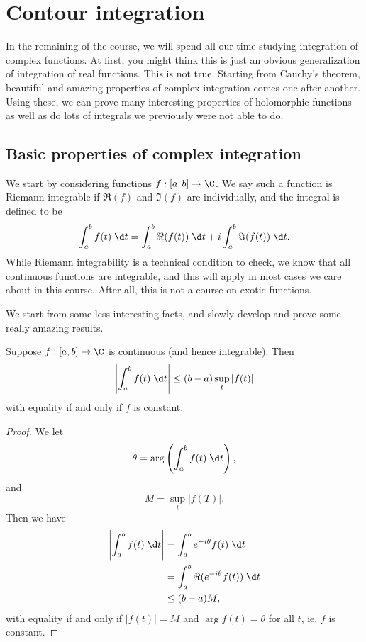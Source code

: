 \documentclass[a4paper]{article}
\begin{document}
\section{Contour integration}
In the remaining of the course, we will spend all our time studying integration of complex functions. At first, you might think this is just an obvious generalization of integration of real functions. This is not true. Starting from Cauchy's theorem, beautiful and amazing properties of complex integration comes one after another. Using these, we can prove many interesting properties of holomorphic functions as well as do lots of integrals we previously were not able to do.

\subsection{Basic properties of complex integration}
We start by considering functions $f: [a, b] \to \C$. We say such a function is Riemann integrable if $\Re(f)$ and $\Im (f)$ are individually, and the integral is defined to be
\[
  \int_a^b f(t) \;\d t = \int_a^b \Re(f(t))\;\d t + i \int_a^b \Im(f(t))\;\d t.
\]
While Riemann integrability is a technical condition to check, we know that all continuous functions are integrable, and this will apply in most cases we care about in this course. After all, this is not a course on exotic functions.

We start from some less interesting facts, and slowly develop and prove some really amazing results.
\begin{lemma}
  Suppose $f: [a, b] \to \C$ is continuous (and hence integrable). Then
  \[
    \left|\int_a^b f(t)\;\d t\right| \leq (b - a) \sup_t |f(t)|
  \]
  with equality if and only if $f$ is constant.
\end{lemma}

\begin{proof}
  We let
  \[
    \theta = \arg\left(\int_a^b f(t)\;\d t\right),
  \]
  and
  \[
    M = \sup_t |f(T)|.
  \]
  Then we have
  \begin{align*}
    \left|\int_a^b f(t)\;\d t\right| &= \int_a^b e^{-i\theta} f(t)\;\d t\\
    &= \int_a^b \Re(e^{-i\theta} f(t))\;\d t\\
    &\leq (b - a) M,
  \end{align*}
  with equality if and only if $|f(t)| =M$ and $\arg f(t) = \theta$ for all $t$, ie. $f$ is constant.
\end{proof}
\end{document}
